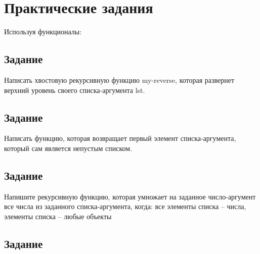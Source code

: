 \section{Практические задания}
Используя функционалы:

\subsection{Задание }

 Написать хвостовую рекурсивную функцию my-reverse, которая развернет верхний уровень своего списка-аргумента lst.
 

\subsection{Задание }

Написать функцию, которая возвращает первый элемент списка-аргумента, который сам является непустым списком.


\subsection{Задание }

Напишите рекурсивную функцию, которая умножает на заданное число-аргумент все числа из заданного списка-аргумента, когда: все элементы списка -- числа,  элементы списка -- любые объекты

 

\subsection{Задание }


